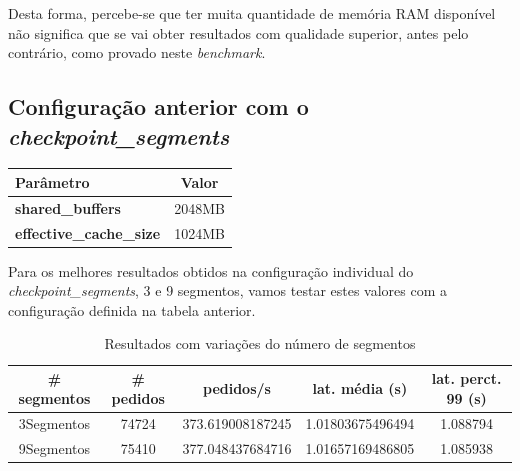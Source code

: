 Desta forma, percebe-se que ter muita quantidade de memória RAM disponível não significa que se vai obter resultados com qualidade superior, antes pelo contrário, como provado neste \textit{benchmark}.

\subsection{Configuração anterior com o \textit{checkpoint\_segments}}

\begin{table}[!h]
\center
\small
\begin{tabular}{|l|c|}
\hline
\textbf{Parâmetro} & \textbf{Valor} \\ \hline
\textbf{shared\_buffers} & 2048MB  \\ \hline
\textbf{effective\_cache\_size} & 1024MB  \\ \hline
\end{tabular}
\end{table}

Para os melhores resultados obtidos na configuração individual do \textit{checkpoint\_segments}, 3 e 9 segmentos, vamos testar estes valores com a configuração definida na tabela anterior.

\begin{table}[!h]
\center
\small
\begin{tabular}{|c|c|c|c|c|}
\hline
\textbf{\# segmentos} & \textbf{\# pedidos} & \textbf{pedidos/s} & \textbf{lat. média (s)} & \textbf{lat. perct. 99 (s)}  \\ \hline
3Segmentos & 74724 & 373.619008187245 & 1.01803675496494 & 1.088794  \\ \hline
9Segmentos & 75410 & 377.048437684716 & 1.01657169486805 & 1.085938  \\ \hline
\end{tabular}
\caption{Resultados com variações do número de segmentos}
\end{table}

